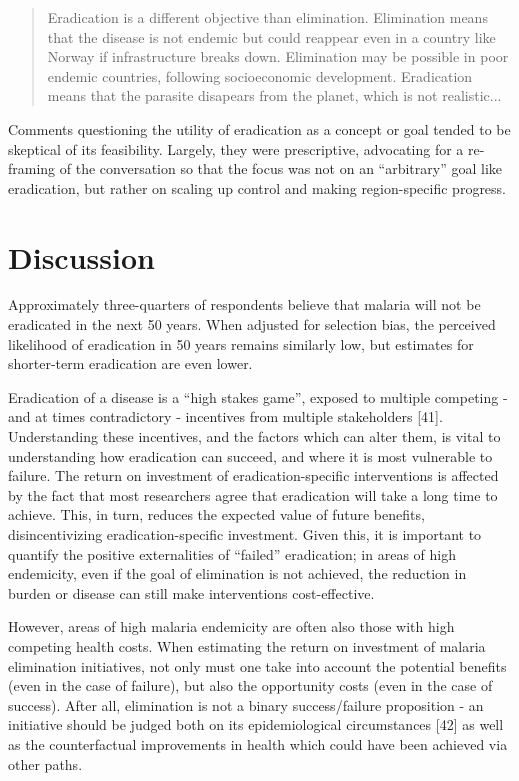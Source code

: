 \documentclass[]{article}
\begin{document}
\begin{quote}
Eradication is a different objective than elimination. Elimination means that the disease is not endemic but could reappear even in a country like Norway if infrastructure breaks down. Elimination may be possible in poor endemic countries, following socioeconomic development. Eradication means that the parasite disapears from the planet, which is not realistic...
\end{quote}

Comments questioning the utility of eradication as a concept or goal
tended to be skeptical of its feasibility. Largely, they were
prescriptive, advocating for a re-framing of the conversation so that
the focus was not on an ``arbitrary'' goal like eradication, but rather
on scaling up control and making region-specific progress.

\section{Discussion}\label{discussion}

Approximately three-quarters of respondents believe that malaria will
not be eradicated in the next 50 years. When adjusted for selection
bias, the perceived likelihood of eradication in 50 years remains
similarly low, but estimates for shorter-term eradication are even
lower.

Eradication of a disease is a ``high stakes game'', exposed to multiple
competing - and at times contradictory - incentives from multiple
stakeholders {[}41{]}. Understanding these incentives, and the factors
which can alter them, is vital to understanding how eradication can
succeed, and where it is most vulnerable to failure. The return on
investment of eradication-specific interventions is affected by the fact
that most researchers agree that eradication will take a long time to
achieve. This, in turn, reduces the expected value of future benefits,
disincentivizing eradication-specific investment. Given this, it is
important to quantify the positive externalities of ``failed''
eradication; in areas of high endemicity, even if the goal of
elimination is not achieved, the reduction in burden or disease can
still make interventions cost-effective.

However, areas of high malaria endemicity are often also those with high
competing health costs. When estimating the return on investment of
malaria elimination initiatives, not only must one take into account the
potential benefits (even in the case of failure), but also the
opportunity costs (even in the case of success). After all, elimination
is not a binary success/failure proposition - an initiative should be
judged both on its epidemiological circumstances {[}42{]} as well as the
counterfactual improvements in health which could have been achieved via
other paths.
\end{document}
